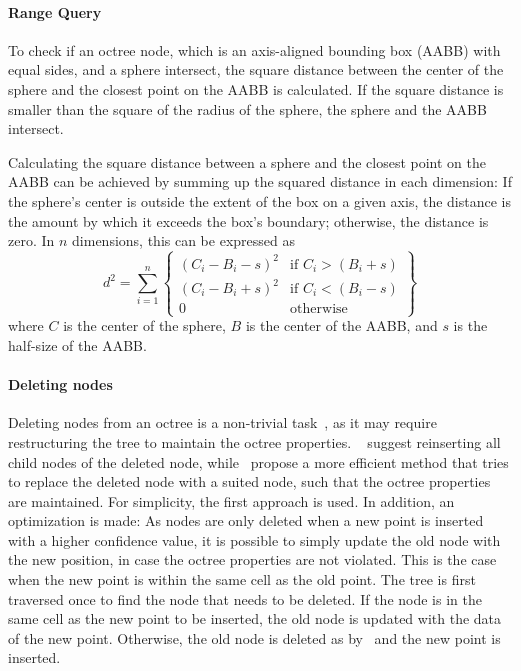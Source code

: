 \paragraph{Range Query}
To check if an octree node, which is an axis-aligned bounding box (AABB) with equal sides, and a sphere intersect,
the square distance between the center of the sphere and the closest point on the AABB is calculated.
If the square distance is smaller than the square of the radius of the sphere, the sphere and the AABB intersect.

Calculating the square distance between a sphere and the closest point on the AABB can be achieved by summing up the
squared distance in each dimension:
If the sphere's center is outside the extent of the box on a given axis,
the distance is the amount by which it exceeds the box's boundary; otherwise, the distance is zero.
In $n$ dimensions, this can be expressed as
\begin{equation}
    d^2 = \sum_{i=1}^{n} \left\{
    \begin{array}{ll}
    (C_i - B_i - s)
        ^2                & \text{if } C_i > (B_i + s) \\
        (C_i - B_i + s)^2 & \text{if } C_i < (B_i - s) \\
        0                 & \text{otherwise}
    \end{array}
    \right\}
\end{equation}
where $C$ is the center of the sphere, $B$ is the center of the AABB, and $s$ is the half-size of the AABB\@.
\parencite{glassner_graphics_1994}

\paragraph{Deleting nodes}
Deleting nodes from an octree is a non-trivial task~\parencite{samet_design_1989, finkel_quad_1974}, as it may require restructuring the tree to maintain the octree properties.
\citeauthor{finkel_quad_1974}~\parencite{finkel_quad_1974} suggest reinserting all child nodes of the deleted node,
while~\cite{samet_deletion_1980} propose a more efficient method that tries to replace the deleted node with a suited node, such that the octree properties are maintained.
For simplicity, the first approach is used.
In addition, an optimization is made:
As nodes are only deleted when a new point is inserted with a higher confidence value,
it is possible to simply update the old node with the new position, in case the octree properties are not violated.
This is the case when the new point is within the same cell as the old point.
The tree is first traversed once to find the node that needs to be deleted.
If the node is in the same cell as the new point to be inserted, the old node is updated with the data of the new point.
Otherwise, the old node is deleted as by~\cite{finkel_quad_1974} and the new point is inserted.

